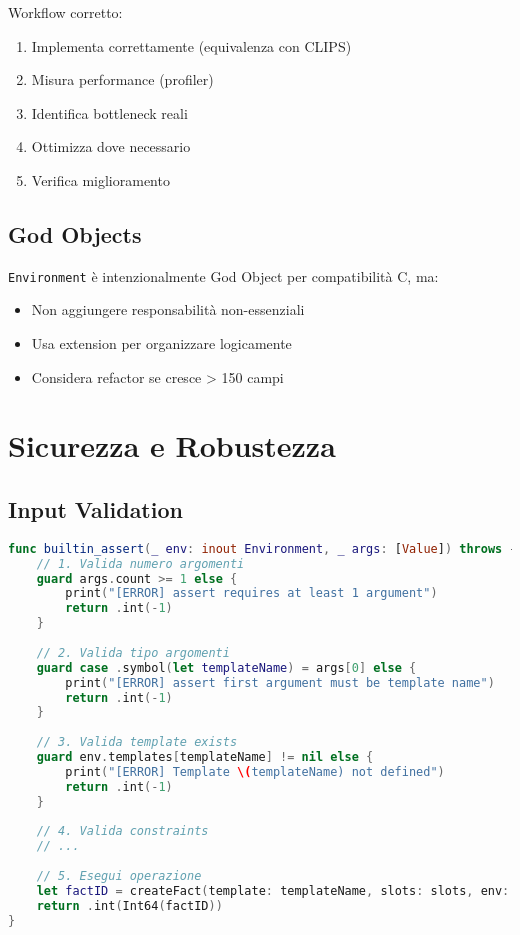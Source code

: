 Workflow corretto:
\begin{enumerate}
\item Implementa correttamente (equivalenza con CLIPS)
\item Misura performance (profiler)
\item Identifica bottleneck reali
\item Ottimizza dove necessario
\item Verifica miglioramento
\end{enumerate}

\subsection{God Objects}

\texttt{Environment} è intenzionalmente God Object per compatibilità C, ma:

\begin{itemize}
\item Non aggiungere responsabilità non-essenziali
\item Usa extension per organizzare logicamente
\item Considera refactor se cresce > 150 campi
\end{itemize}

\section{Sicurezza e Robustezza}

\subsection{Input Validation}

\begin{lstlisting}[language=Swift]
func builtin_assert(_ env: inout Environment, _ args: [Value]) throws -> Value {
    // 1. Valida numero argomenti
    guard args.count >= 1 else {
        print("[ERROR] assert requires at least 1 argument")
        return .int(-1)
    }
    
    // 2. Valida tipo argomenti
    guard case .symbol(let templateName) = args[0] else {
        print("[ERROR] assert first argument must be template name")
        return .int(-1)
    }
    
    // 3. Valida template exists
    guard env.templates[templateName] != nil else {
        print("[ERROR] Template \(templateName) not defined")
        return .int(-1)
    }
    
    // 4. Valida constraints
    // ...
    
    // 5. Esegui operazione
    let factID = createFact(template: templateName, slots: slots, env: &env)
    return .int(Int64(factID))
}
\end{lstlisting}

